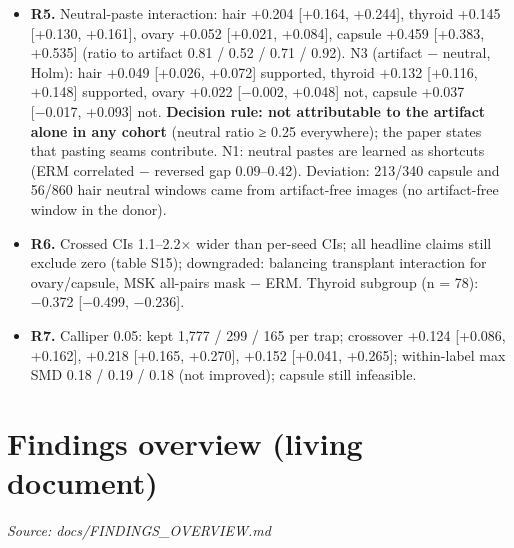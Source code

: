 {\begin{itemize}
\item
  \textbf{R5.} Neutral-paste interaction: hair +0.204 {[}+0.164, +0.244{]}, thyroid +0.145 {[}+0.130, +0.161{]}, ovary +0.052
  {[}+0.021, +0.084{]}, capsule +0.459 {[}+0.383, +0.535{]} (ratio to artifact 0.81 / 0.52 / 0.71 / 0.92). N3 (artifact −
  neutral, Holm): hair +0.049 {[}+0.026, +0.072{]} supported, thyroid +0.132 {[}+0.116, +0.148{]} supported, ovary +0.022
  {[}−0.002, +0.048{]} not, capsule +0.037 {[}−0.017, +0.093{]} not. \textbf{Decision rule: not attributable to the artifact alone in
  any cohort} (neutral ratio ≥ 0.25 everywhere); the paper states that pasting seams contribute. N1: neutral pastes are
  learned as shortcuts (ERM correlated − reversed gap 0.09--0.42). Deviation: 213/340 capsule and 56/860 hair neutral
  windows came from artifact-free images (no artifact-free window in the donor).
\item
  \textbf{R6.} Crossed CIs 1.1--2.2× wider than per-seed CIs; all headline claims still exclude zero (table S15); downgraded:
  balancing transplant interaction for ovary/capsule, MSK all-pairs mask − ERM. Thyroid subgroup (n = 78): −0.372
  {[}−0.499, −0.236{]}.
\item
  \textbf{R7.} Calliper 0.05: kept 1,777 / 299 / 165 per trap; crossover +0.124 {[}+0.086, +0.162{]}, +0.218 {[}+0.165, +0.270{]},
  +0.152 {[}+0.041, +0.265{]}; within-label max \textbar SMD\textbar{} 0.18 / 0.19 / 0.18 (not improved); capsule still infeasible.
\end{itemize}

}

\section{Findings overview (living document)}\label{doc:FINDINGS_OVERVIEW}
\noindent\textit{Source: docs/FINDINGS\_OVERVIEW.md}

